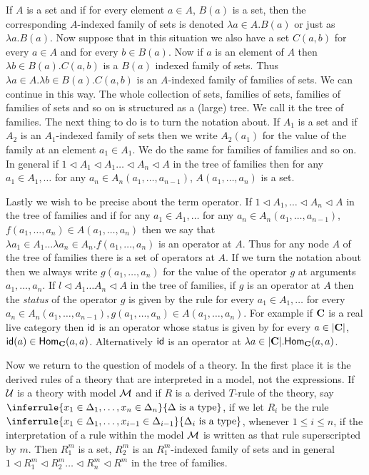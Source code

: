 If $A$ is a set and if for every element $a\in A$, $B(a)$ is a set, then the corresponding $A$-indexed family of sets is denoted $\lambda a\in A.B(a)$ or just as $\lambda a . B(a)$.
%
 Now suppose that in this situation we also have a set $C(a,b)$ for every $a\in A$ and for every $b\in B(a)$.
%
 Now if $a$ is an element of $A$ then $\lambda b\in B(a).C(a,b)$ is a $B(a)$ indexed family of sets.
%
 Thus $\lambda a\in A.\lambda b\in B(a). C(a,b)$ is an $A$-indexed family of families of sets.
%
 We can continue in this way.
%
 The whole collection of sets, families of sets, families of families of sets and so on is structured as a (large) tree.
%
 We call it the tree of families.
%
 The next thing to do is to turn the notation about.
%
 If $A_1$ is a set and if $A_2$ is an $A_1$-indexed family of sets then we write $A_2(a_1)$ for the value of the family at an element $a_1\in A_1$.
%
 We do the same for families of families and so on.
%
 In general if $1\triangleleft A_1\triangleleft A_1\ldots\triangleleft A_n\triangleleft A$ in the tree of families then for any $a_1\in A_1,\ldots$ for any $a_n\in A_n(a_1,\ldots,a_{n-1})$, $A(a_1,\ldots,a_n)$ is a set.

Lastly we wish to be precise about the term operator.
%
 If $1\triangleleft A_1,\ldots\triangleleft A_n\triangleleft A$ in the tree of families and if for any $a_1\in A_1,\ldots$ for any $a_n\in A_n(a_1,\ldots,a_{n-1})$, $f(a_1,\ldots,a_n)\in A(a_1,\ldots,a_n)$ then we say that $\lambda a_1\in A_1\ldots\lambda a_n\in A_n.f(a_1,\ldots,a_n)$ is an operator at $A$.
%
 Thus for any node $A$ of the tree of families there is a set of operators at $A$.
%
 If we turn the notation about then we always write $g(a_1,\ldots,a_n)$ for the value of the operator $g$ at arguments $a_1,\ldots,a_n$. If $l\triangleleft A_1\ldots A_n\triangleleft A$ in the tree of families, if $g$ is an operator at $A$ then the \emph{status} of the operator $g$ is given by the rule for every $a_1\in A_1,\ldots$ for every $a_n\in A_n(a_1,\ldots,a_{n-1}), g(a_1,\ldots, a_n)\in A(a_1,\ldots,a_n)$.
%
 For example if $\mathbf{C}$ is a real live category then $\mathsf{id}$ is an operator whose status is given by for every $a\in |\mathbf{C}|$, $\mathsf{id}(a)\in\mathsf{Hom}_{\mathbf{C}}(a,a)$.
%
 Alternatively $\mathsf{id}$ is an operator at $\lambda a\in |\mathbf{C}|.\mathsf{Hom}_{\mathbf{C}}(a,a)$.

Now we return to the question of models of a theory.
%
 In the first place it is the derived rules of a theory that are interpreted in a model, not the expressions.
%
 If $\mathcal{U}$ is a theory with model $\mathcal{M}$ and if $R$ is a derived $T$-rule of the theory, say $\inferrule{x_1\in\Delta_1,\ldots,x_n\in\Delta_n}{\Delta\isatype}$, if we let $R_i$ be the rule $\inferrule{x_1\in\Delta_1,\ldots,x_{i-1}\in\Delta_{i-1}}{\Delta_i\isatype}$, whenever $1\leq i\leq n$, if the interpretation of a rule within the model $\mathcal{M}$ is written as that rule superscripted by $m$.
%
 Then $R_1^m$ is a set, $R_2^m$ is an $R_1^m$-indexed family of sets and in general $1\triangleleft R_1^m\triangleleft R_2^m\ldots\triangleleft R_n^m\triangleleft R^m$ in the tree of families.

